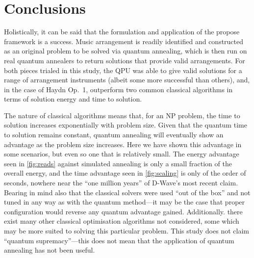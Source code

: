\documentclass[12pt]{article}
\theoremstyle{definition}
\begin{document}
\section{Conclusions}

Holistically, it can be said that the formulation and application of the propose framework is a success. Music arrangement is readily identified and constructed as an original problem to be solved via quantum annealing, which is then run on real quantum annealers to return solutions that provide valid arrangements. For both pieces trialed in this study, the QPU was able to give valid solutions for a range of arrangement instruments (albeit some more successful than others), and, in the case of Haydn Op.\ 1, outperform two common classical algorithms in terms of solution energy and time to solution.

The nature of classical algorithms means that, for an NP problem, the time to solution increases exponentially with problem size. Given that the quantum time to solution remains constant, quantum annealing will eventually show an advantage as the problem size increases. Here we have shown this advantage in some scenarios, but even so one that is relatively small. The energy advantage seen in \cref{fig:reads} against simulated annealing is only a small fraction of the overall energy, and the time advantage seen in \cref{fig:scaling} is only of the order of seconds, nowhere near the ``one million years'' of D-Wave's most recent claim. Bearing in mind also that the classical solvers were used ``out of the box'' and not tuned in any way as with the quantum method---it may be the case that proper configuration would reverse any quantum advantage gained. Additionally. there exist many other classical optimisation algorithms not considered, some which may be more suited to solving this particular problem. This study does not claim ``quantum supremacy''---this does not mean that the application of quantum annealing has not been useful.
\end{document}
